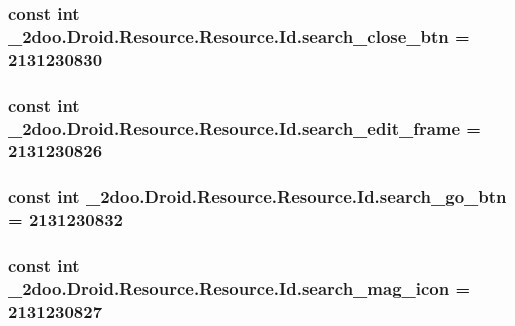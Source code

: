 \hypertarget{class__2doo_1_1_droid_1_1_resource_1_1_id_86696e0cfd1054093b9ff9ba89e024a3}{
\subsubsection[{search\_\-close\_\-btn}]{\setlength{\rightskip}{0pt plus 5cm}const int \_\-2doo.Droid.Resource.Resource.Id.search\_\-close\_\-btn = 2131230830}}
\label{class__2doo_1_1_droid_1_1_resource_1_1_id_86696e0cfd1054093b9ff9ba89e024a3}


\hypertarget{class__2doo_1_1_droid_1_1_resource_1_1_id_afa535516cecca146bda583dd1f5006d}{
\subsubsection[{search\_\-edit\_\-frame}]{\setlength{\rightskip}{0pt plus 5cm}const int \_\-2doo.Droid.Resource.Resource.Id.search\_\-edit\_\-frame = 2131230826}}
\label{class__2doo_1_1_droid_1_1_resource_1_1_id_afa535516cecca146bda583dd1f5006d}


\hypertarget{class__2doo_1_1_droid_1_1_resource_1_1_id_b0d218908a4a417a7ea4bf2b4c26c263}{
\subsubsection[{search\_\-go\_\-btn}]{\setlength{\rightskip}{0pt plus 5cm}const int \_\-2doo.Droid.Resource.Resource.Id.search\_\-go\_\-btn = 2131230832}}
\label{class__2doo_1_1_droid_1_1_resource_1_1_id_b0d218908a4a417a7ea4bf2b4c26c263}


\hypertarget{class__2doo_1_1_droid_1_1_resource_1_1_id_669ac2638844cecc0684201bf2af08fb}{
\subsubsection[{search\_\-mag\_\-icon}]{\setlength{\rightskip}{0pt plus 5cm}const int \_\-2doo.Droid.Resource.Resource.Id.search\_\-mag\_\-icon = 2131230827}}
\label{class__2doo_1_1_droid_1_1_resource_1_1_id_669ac2638844cecc0684201bf2af08fb}


